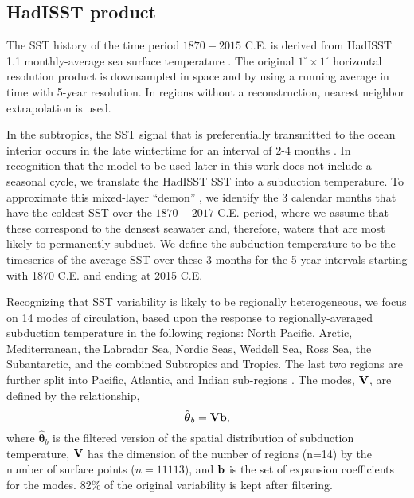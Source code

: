 \documentclass[12pt]{article}
\begin{document}
\subsection{HadISST product}

The SST history of the time period $1870-2015$ C.E. is derived from HadISST 1.1 monthly-average sea surface temperature \cite{Rayner-Parker-2003:Global}. The original $1^\circ \times 1^\circ$ horizontal resolution product is downsampled in space and by using a running average in time with 5-year resolution. In regions without a reconstruction, nearest neighbor extrapolation is used.

In the subtropics, the SST signal that is preferentially transmitted to the ocean interior occurs in the late wintertime for an interval of 2-4 months \cite{Stommel--1979:Determination}. In recognition that the model to be used later in this work does not include a seasonal cycle, we translate the HadISST SST into a subduction temperature. To approximate this mixed-layer ``demon'' \cite{Stommel--1979:Determination}, we identify the 3 calendar months that have the coldest SST over the $1870-2017$ C.E. period, where we assume that these correspond to the densest seawater and, therefore, waters that are most likely to permanently subduct. We define the subduction temperature to be the timeseries of the average SST over these 3 months for the 5-year intervals starting with 1870 C.E. and ending at 2015 C.E. 

Recognizing that SST variability is likely to be regionally heterogeneous, we focus on 14 modes of circulation, based upon the response to regionally-averaged subduction temperature in the following regions: North Pacific, Arctic, Mediterranean,  the Labrador Sea, Nordic Seas, Weddell Sea, Ross Sea, the Subantarctic, and the combined Subtropics and Tropics. The last two regions are further split into Pacific, Atlantic, and Indian sub-regions \cite{Gebbie-Huybers-2011:How}. The modes, ${\bf V}$, are defined by the relationship,
\begin{equation}
{\hat {\boldsymbol \theta}}_b = {\bf V}{\bf b},
\end{equation}
where ${\hat {\boldsymbol \theta}}_b$ %
is the filtered version of the spatial distribution of subduction temperature,  ${\bf V}$ has the dimension of the number of regions (n=14) by the number of surface points ($n=11113$), and ${\bf b}$ is the set of expansion coefficients for the modes. 82\% of the original variability is kept after filtering.
\end{document}
